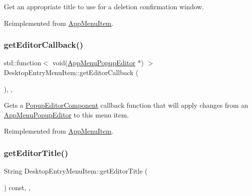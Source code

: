 Get an appropriate title to use for a deletion confirmation window. 

Reimplemented from \mbox{\hyperlink{classAppMenuItem_a93bd0cf3b4e28d09a4975023b383c1dc}{App\+Menu\+Item}}.

\mbox{\label{classDesktopEntryMenuItem_a5f32e4ceb94436758097c546aa22928f}} 
\subsubsection{\texorpdfstring{get\+Editor\+Callback()}{getEditorCallback()}}
{\footnotesize\ttfamily std\+::function$<$ void(\mbox{\hyperlink{classAppMenuPopupEditor}{App\+Menu\+Popup\+Editor}} $\ast$) $>$ Desktop\+Entry\+Menu\+Item\+::get\+Editor\+Callback (\begin{DoxyParamCaption}{ }\end{DoxyParamCaption})\hspace{0.3cm}{\ttfamily [override]}, {\ttfamily [protected]}, {\ttfamily [virtual]}}

Gets a \mbox{\hyperlink{classPopupEditorComponent}{Popup\+Editor\+Component}} callback function that will apply changes from an \mbox{\hyperlink{classAppMenuPopupEditor}{App\+Menu\+Popup\+Editor}} to this menu item. 

Reimplemented from \mbox{\hyperlink{classAppMenuItem_af742017ff127e5f36da1e206205c86ee}{App\+Menu\+Item}}.

\mbox{\label{classDesktopEntryMenuItem_a0b57ee9d99e2ddf037ba8fe91c725bab}} 
\subsubsection{\texorpdfstring{get\+Editor\+Title()}{getEditorTitle()}}
{\footnotesize\ttfamily String Desktop\+Entry\+Menu\+Item\+::get\+Editor\+Title (\begin{DoxyParamCaption}{ }\end{DoxyParamCaption}) const\hspace{0.3cm}{\ttfamily [override]}, {\ttfamily [protected]}, {\ttfamily [virtual]}}

